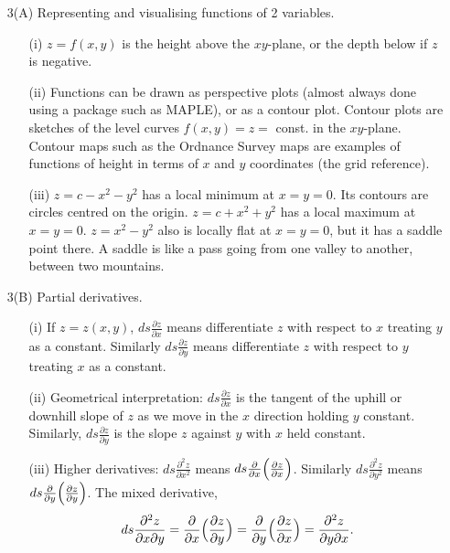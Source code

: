 \documentclass{article}
\begin{document}
\begin{enumerate}

\item[3(A)] Representing and visualising functions of 2 variables.

\begin{enumerate}

\item[(i)] $z=f(x,y)$ is the height above the $xy$-plane, or
the depth below if $z$ is negative.

\item[(ii)] Functions can be drawn as perspective plots
(almost always done using a package such as MAPLE), or as
a contour plot. Contour plots are sketches of the level curves
$f(x,y) = z = $ const. in the $xy$-plane. Contour maps such as
the Ordnance Survey maps are examples of functions of height
in terms of $x$ and $y$ coordinates (the grid reference).

\item[(iii)] $z = c - x^2 -y^2$ has a local minimum at $x = y =0$.
Its contours are circles centred on the origin. $z = c+x^2+y^2$
has a local maximum at $x=y=0$. $z=x^2-y^2$ also is locally
flat at $x=y=0$, but it has a saddle point there. A saddle
is like a pass going from one valley to another, between two
mountains.

\end{enumerate}

\item[3(B)] Partial derivatives.

\begin{enumerate}

\item[(i)] If $z=z(x,y)$, ${ds \frac{\partial z}{\partial x}}$
means differentiate $z$ with respect to $x$ treating $y$ as a constant.
Similarly   ${ds \frac{\partial z}{\partial y}}$ means differentiate
$z$ with respect to $y$ treating $x$ as a constant.

\item[(ii)] Geometrical interpretation: ${ds \frac{\partial z}{\partial x}}$
is the tangent of the uphill or downhill slope of $z$ as we move in
the $x$ direction holding $y$ constant. Similarly,
${ds \frac{\partial z}{\partial y}}$ is the slope $z$ against $y$
with $x$ held constant.

\item[(iii)] Higher derivatives: ${ds \frac{\partial^2 z}{\partial x^2}}$
means ${ds \frac{\partial} {\partial x}
\Bigl( \frac{\partial z}{\partial x} \Bigr) }$. Similarly
${ds \frac{\partial^2 z}{\partial y^2}}$ means
${ds \frac{\partial} {\partial y}
\Bigl( \frac{\partial z}{\partial y} \Bigr) }$. The mixed
derivative,
$${ds \frac{\partial^2 z}{\partial x \partial y} =
 \frac{\partial} {\partial x}
\Bigl( \frac{\partial z}{\partial y} \Bigr)
= \frac{\partial} {\partial y}
\Bigl( \frac{\partial z}{\partial x} \Bigr)=
\frac{\partial^2 z}{\partial y \partial x} }.$$


\end{enumerate}
\end{enumerate}
\end{document}
